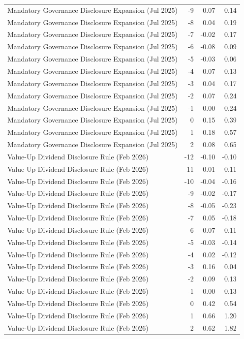 \begin{table}
\begin{tabular}{lrrr}
Mandatory Governance Disclosure Expansion (Jul 2025) & -9 & 0.07 & 0.14 \\
Mandatory Governance Disclosure Expansion (Jul 2025) & -8 & 0.04 & 0.19 \\
Mandatory Governance Disclosure Expansion (Jul 2025) & -7 & -0.02 & 0.17 \\
Mandatory Governance Disclosure Expansion (Jul 2025) & -6 & -0.08 & 0.09 \\
Mandatory Governance Disclosure Expansion (Jul 2025) & -5 & -0.03 & 0.06 \\
Mandatory Governance Disclosure Expansion (Jul 2025) & -4 & 0.07 & 0.13 \\
Mandatory Governance Disclosure Expansion (Jul 2025) & -3 & 0.04 & 0.17 \\
Mandatory Governance Disclosure Expansion (Jul 2025) & -2 & 0.07 & 0.24 \\
Mandatory Governance Disclosure Expansion (Jul 2025) & -1 & 0.00 & 0.24 \\
Mandatory Governance Disclosure Expansion (Jul 2025) & 0 & 0.15 & 0.39 \\
Mandatory Governance Disclosure Expansion (Jul 2025) & 1 & 0.18 & 0.57 \\
Mandatory Governance Disclosure Expansion (Jul 2025) & 2 & 0.08 & 0.65 \\
Value-Up Dividend Disclosure Rule (Feb 2026) & -12 & -0.10 & -0.10 \\
Value-Up Dividend Disclosure Rule (Feb 2026) & -11 & -0.01 & -0.11 \\
Value-Up Dividend Disclosure Rule (Feb 2026) & -10 & -0.04 & -0.16 \\
Value-Up Dividend Disclosure Rule (Feb 2026) & -9 & -0.02 & -0.17 \\
Value-Up Dividend Disclosure Rule (Feb 2026) & -8 & -0.05 & -0.23 \\
Value-Up Dividend Disclosure Rule (Feb 2026) & -7 & 0.05 & -0.18 \\
Value-Up Dividend Disclosure Rule (Feb 2026) & -6 & 0.07 & -0.11 \\
Value-Up Dividend Disclosure Rule (Feb 2026) & -5 & -0.03 & -0.14 \\
Value-Up Dividend Disclosure Rule (Feb 2026) & -4 & 0.02 & -0.12 \\
Value-Up Dividend Disclosure Rule (Feb 2026) & -3 & 0.16 & 0.04 \\
Value-Up Dividend Disclosure Rule (Feb 2026) & -2 & 0.09 & 0.13 \\
Value-Up Dividend Disclosure Rule (Feb 2026) & -1 & 0.00 & 0.13 \\
Value-Up Dividend Disclosure Rule (Feb 2026) & 0 & 0.42 & 0.54 \\
Value-Up Dividend Disclosure Rule (Feb 2026) & 1 & 0.66 & 1.20 \\
Value-Up Dividend Disclosure Rule (Feb 2026) & 2 & 0.62 & 1.82 \\
\bottomrule
\end{tabular}
\end{table}
